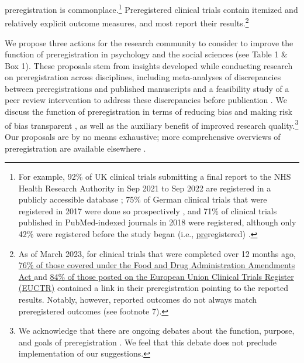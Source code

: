 \documentclass[authordate, meta, issue]{jote-new-article}
\begin{document}
preregistration is commonplace.\footnote{ For example, 92\% of UK clinical trials submitting a final report to the NHS Health Research Authority in Sep 2021 to Sep 2022 are registered in a publicly accessible database \parencites{Authority2021}; 75\% of German clinical trials that were registered in 2017 were done so prospectively \parencites{BIHQUEST2023}, and 71\% of clinical trials published in PubMed-indexed journals in 2018 were registered, although only 42\% were registered before the study began (i.e., \underline{pre}registered) \parencites{Al-Durra2020}.} Preregistered clinical trials contain itemized and relatively explicit outcome measures, and most report their results.\footnote{ As of March 2023, for clinical trials that were completed over 12 months ago, \href{https://fdaaa.trialstracker.net/}{76\% of those covered under the Food and Drug Administration Amendments Act }and \href{https://eu.trialstracker.net/}{84\% of those posted on the European Union Clinical Trials Register (EUCTR)} contained a link in their preregistration pointing to the reported results. Notably, however, reported outcomes do not always match preregistered outcomes (see footnote 7).}







We propose three actions for the research community to consider to improve the function of preregistration in psychology and the social sciences (see Table 1 \& Box 1). These proposals stem from insights developed while conducting research on preregistration across disciplines, including meta-analyses of discrepancies between preregistrations and published manuscripts \parencites{TARG2021} and a feasibility study of a peer review intervention to address these discrepancies before publication \parencites{TARG2022}. We discuss the function of preregistration in terms of reducing bias and making risk of bias transparent \parencites[as outlined in][]{Hardwicke2023}, as well as the auxiliary benefit of improved research quality.\footnote{ We acknowledge that there are ongoing debates about the function, purpose, and goals of preregistration \parencites[e.g.,][]{McPhetres2020}. We feel that this debate does not preclude implementation of our suggestions.} Our proposals are by no means exhaustive; more comprehensive overviews of preregistration are available elsewhere \parencites[e.g.,][]{Hardwicke2023}{DeVito2022}.
\end{document}
